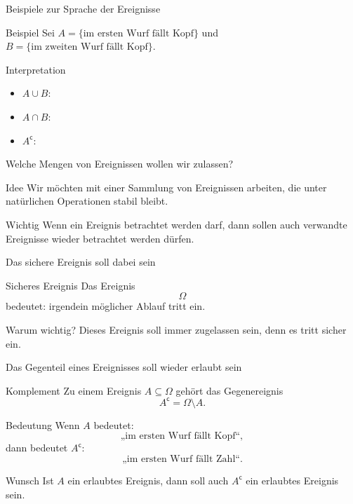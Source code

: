 \documentclass{beamer}
\begin{document}
\begin{frame}{Beispiele zur Sprache der Ereignisse}
\begin{block}{Beispiel}
Sei \(A=\{\text{im ersten Wurf fällt Kopf}\}\) und
\(B=\{\text{im zweiten Wurf fällt Kopf}\}\).
\end{block}

\begin{block}{Interpretation}
\begin{itemize}
    \item \(A\cup B\): 
    \item \(A\cap B\): 
    \item \(A^{\mathsf c}\): 
\end{itemize}
\end{block}
\end{frame}

\begin{frame}{Welche Mengen von Ereignissen wollen wir zulassen?}
\begin{block}{Idee}
Wir möchten mit einer Sammlung von Ereignissen arbeiten, die unter natürlichen Operationen stabil bleibt.
\end{block}

\begin{block}{Wichtig}
Wenn ein Ereignis betrachtet werden darf, dann sollen auch verwandte Ereignisse wieder betrachtet werden dürfen.
\end{block}
\end{frame}

\begin{frame}{Das sichere Ereignis soll dabei sein}
\begin{block}{Sicheres Ereignis}
Das Ereignis
\[
\Omega
\]
bedeutet: irgendein möglicher Ablauf tritt ein.
\end{block}

\begin{block}{Warum wichtig?}
Dieses Ereignis soll immer zugelassen sein, denn es tritt sicher ein.
\end{block}
\end{frame}

\begin{frame}{Das Gegenteil eines Ereignisses soll wieder erlaubt sein}
\begin{block}{Komplement}
Zu einem Ereignis \(A\subseteq\Omega\) gehört das Gegenereignis
\[
A^{\mathsf c}=\Omega\setminus A.
\]
\end{block}

\begin{block}{Bedeutung}
Wenn \(A\) bedeutet:
\[
\text{„im ersten Wurf fällt Kopf“},
\]
dann bedeutet \(A^{\mathsf c}\):
\[
\text{„im ersten Wurf fällt Zahl“.}
\]
\end{block}

\begin{block}{Wunsch}
Ist \(A\) ein erlaubtes Ereignis, dann soll auch \(A^{\mathsf c}\) ein erlaubtes Ereignis sein.
\end{block}
\end{frame}
\end{document}
